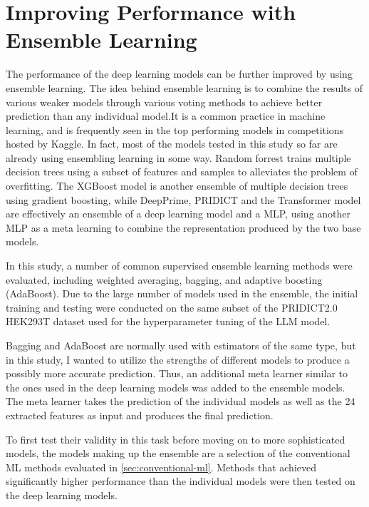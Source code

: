 \section{Improving Performance with Ensemble Learning}

The performance of the deep learning models can be further improved by using ensemble learning. The idea behind ensemble learning is to combine the results of various weaker models through various voting methods to achieve better prediction than any individual model.It is a common practice in machine learning, and is frequently seen in the top performing models in competitions hosted by Kaggle. In fact, most of the models tested in this study so far are already using ensembling learning in some way. Random forrest trains multiple decision trees using a subset of features and samples to alleviates the problem of overfitting. The XGBoost model is another ensemble of multiple decision trees using gradient boosting, while DeepPrime, PRIDICT and the Transformer model are effectively an ensemble of a deep learning model and a MLP, using another MLP as a meta learning to combine the representation produced by the two base models. 

In this study, a number of common supervised ensemble learning methods were evaluated, including weighted averaging, bagging, and adaptive boosting (AdaBoost). Due to the large number of models used in the ensemble, the initial training and testing were conducted on the same subset of the PRIDICT2.0 HEK293T dataset used for the hyperparameter tuning of the LLM model.

Bagging and  AdaBoost are normally used with estimators of the same type, but in this study, I wanted to utilize the strengths of different models to produce a possibly more accurate prediction. Thus, an additional meta learner similar to the ones used in the deep learning models was added to the ensemble models. The meta learner takes the prediction of the individual models as well as the 24 extracted features as input and produces the final prediction.

To first test their validity in this task before moving on to more sophisticated models, the models making up the ensemble are a selection of the conventional ML methods evaluated in \autoref{sec:conventional-ml}. Methods that achieved significantly higher performance than the individual models were then tested on the deep learning models.


